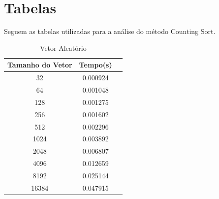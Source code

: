 \documentclass[12pt,a4paper,twoside]{report}
\begin{document}
\begin{enumerate}
\begin{enumerate}
										\end{enumerate}


\end{enumerate}

\chapter{Tabelas}

Seguem as tabelas utilizadas para a análise do método Counting Sort.

\begin{table}[h]
  \centering
  \caption{Vetor Aleatório \label{tab:aleatorio}}
  \begin{tabular}{ccc} \\\hline
  \textbf{Tamanho do Vetor}  & \textbf{Tempo(s)} \\\hline
  32                                   & 0.000924          \\\hline
  64                                   & 0.001048          \\\hline
  128                                  & 0.001275          \\\hline
  256                                  & 0.001602          \\\hline
  512                                  & 0.002296          \\\hline
  1024                                 & 0.003892          \\\hline
  2048                                 & 0.006807          \\\hline
  4096                                 & 0.012659         \\\hline
  8192                                 & 0.025144         \\\hline
  16384                                & 0.047915        \\\hline
  \end{tabular}
\end{table}
\end{document}
